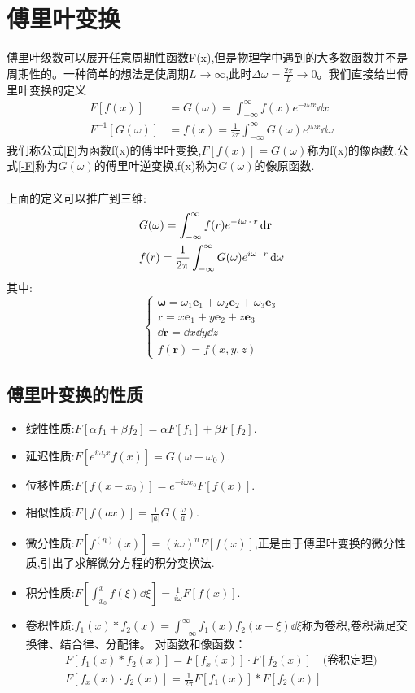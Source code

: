 \section{傅里叶变换}
傅里叶级数可以展开任意周期性函数F(x),但是物理学中遇到的大多数函数并不是周期性的。一种简单的想法是使周期$L\rightarrow \infty$,此时$\Delta\omega=\frac{2\pi}{L}\rightarrow 0$。\cite{MP}我们直接给出傅里叶变换的定义
\begin{align}
    F[f(x)]&=G(\omega)=\int_{-\infty}^{\infty} f(x)e^{-i\omega x}\dd{x}\label{F}\\
    F^{-1}[G(\omega)]&=f(x)=\frac{1}{2\pi}\int_{-\infty}^{\infty}G(\omega)e^{i\omega x}\dd{\omega}\label{-F}
\end{align}
我们称公式\ref{F}为函数f(x)的傅里叶变换,$F[f(x)]=G(\omega)$称为f(x)的像函数.公式\ref{-F}称为$G(\omega)$的傅里叶逆变换,f(x)称为$G(\omega)$的像原函数.
\paragraph{}
上面的定义可以推广到三维:
\begin{align}
    &G(\mathbf{\emph{$\omega$}})=\int_{-\infty}^{\infty} f(\mathbf{\emph{$r$}})e^{-i\mathbf{\emph{$\omega\cdot r$}} }\dd{\mathbf{r}}\\
    &f(\mathbf{\emph{$r$}})=\frac{1}{2\pi}\int_{-\infty}^{\infty}G(\mathbf{\emph{$\omega$}})e^{i\mathbf{\emph{$\omega\cdot r$}}}\dd{\mathbf{\emph{$\omega$}}}
\end{align}
其中:
\[\begin{cases}
    \mathbf{\omega}=\omega_1\mathbf{e}_1+\omega_2\mathbf{e}_2+\omega_3\mathbf{e}_3\\
    \mathbf{r}=x\mathbf{e}_1+y\mathbf{e}_2+z\mathbf{e}_3\\
    \dd{\mathbf{r}}=\dd{x}\dd{y}\dd{z}\\
    f(\mathbf{r})=f(x,y,z)
\end{cases}\]
\subsection{傅里叶变换的性质}
\begin{itemize}
    \item 线性性质:$F[\alpha f_1+\beta f_2]=\alpha F[f_1]+\beta F[f_2]$.
    \item 延迟性质:$F[e^{i\omega_0x}f(x)]=G(\omega-\omega_0)$.
    \item 位移性质:$F[f(x-x_0)]=e^{-i\omega x_0}F[f(x)]$.
    \item 相似性质:$F[f(ax)]=\frac{1}{|a|}G(\frac{\omega}{a})$.
    \item 微分性质:$F[f^{(n)}(x)]=(i\omega)^nF[f(x)]$,正是由于傅里叶变换的微分性质,引出了求解微分方程的积分变换法.
    \item 积分性质:$F[\int_{x_0}^{x}f(\xi)\dd\xi]=\frac{1}{i\omega}F[f(x)]$.
    \item 卷积性质:$f_1(x)*f_2(x)=\int_{-\infty}^{\infty}f_1(x)f_2(x-\xi)\dd\xi$称为卷积,卷积满足交换律、结合律、分配律。
            对函数和像函数：
            \begin{gather}
                F[f_1(x)*f_2(x)]=F[f_x(x)]\cdot F[f_2(x)]\quad\text{(卷积定理)}\\
                F[f_x(x)\cdot f_2(x)]=\frac{1}{2\pi}F[f_1(x)]*F[f_2(x)]
            \end{gather}
\end{itemize}

